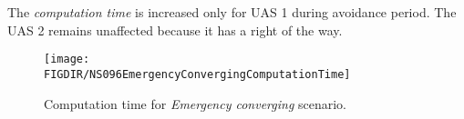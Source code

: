 The \emph{computation time} is increased only for UAS 1 during avoidance period. The UAS 2 remains unaffected because it has a right of the way.

\begin{figure}[H]
    \centering
    \texttt{[image: \\FIGDIR/NS096EmergencyConvergingComputationTime]} 
    \caption{Computation time for \emph{Emergency converging} scenario.}
    \label{fig:emergencyConvergingComputationTime}
\end{figure}

